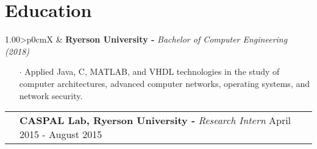 \documentclass[a4paper, oneside, final]{scrartcl} %
\newcommand{\gray}{\rowcolor[gray]{.90}} %
\begin{document}
\begin{center}
\begin{itemize}
  \end{itemize}

  \vspace{-0.3cm}



  \section{Education}
  \begin{flushleft}
  \begin{tabularx}{1.00\linewidth}{>{\raggedleft\scshape}p{0cm}X}
    \gray& \textbf{Ryerson University -} \textit{Bachelor of Computer Engineering (2018)}\\
  \end{tabularx}
  \begin{itemize}\itemsep-0.2cm
      \vspace{-0.1cm}
        \item[$\cdot$] Applied Java, C, MATLAB, and VHDL technologies in the study of computer architectures, advanced computer networks, operating systems, and network security. \\
  \end{itemize}
  \end{flushleft}
  \vspace{-0.2cm}
  \begin{tabularx}{1.00\linewidth}{>{\raggedleft\scshape}p{0cm}X}
    \gray& \textbf{CASPAL Lab, Ryerson University -} \textit{Research Intern} \hfill {April 2015 - August 2015}\\
  \end{tabularx}
  \vspace{-0.5cm}
  \begin{itemize}\itemsep-0.2cm
      \vspace{-0.1cm}


\end{itemize}
\end{center}
\end{document}
